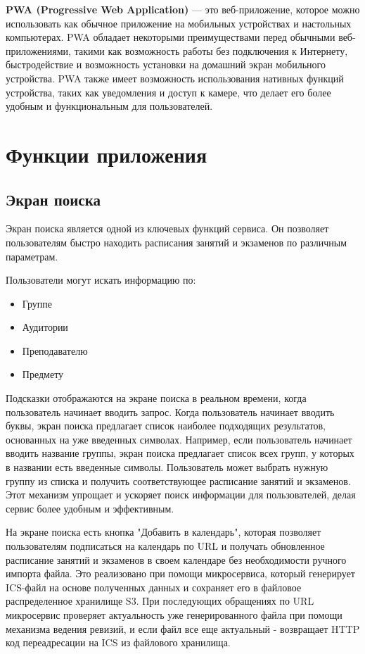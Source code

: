 \textbf{PWA (Progressive Web Application)} --- это веб-приложение, 
которое можно использовать как обычное приложение на мобильных устройствах 
и настольных компьютерах. PWA обладает некоторыми преимуществами 
перед обычными веб-приложениями, такими как возможность работы без 
подключения к Интернету, быстродействие и возможность установки 
на домашний экран мобильного устройства. PWA также имеет 
возможность использования нативных функций устройства, 
таких как уведомления и доступ к камере, что делает его 
более удобным и функциональным для пользователей.

\section{Функции приложения}
\subsection{Экран поиска}
Экран поиска является одной из ключевых функций сервиса.
Он позволяет пользователям быстро находить расписания занятий и экзаменов по различным параметрам.

Пользователи могут искать информацию по:
\begin{itemize}
    \item Группе
    \item Аудитории
    \item Преподавателю
    \item Предмету
\end{itemize}

Подсказки отображаются на экране поиска в реальном времени, когда пользователь начинает вводить запрос.
Когда пользователь начинает вводить буквы, экран поиска предлагает список наиболее подходящих результатов,
основанных на уже введенных символах.
Например, если пользователь начинает вводить название группы,
экран поиска предлагает список всех групп, у которых в названии есть введенные символы.
Пользователь может выбрать нужную группу из списка и получить соответствующее расписание занятий и экзаменов.
Этот механизм упрощает и ускоряет поиск информации для пользователей,
делая сервис более удобным и эффективным.

На экране поиска есть кнопка "Добавить в календарь",
которая позволяет пользователям подписаться на календарь по URL
и получать обновленное расписание занятий и экзаменов
в своем календаре без необходимости ручного импорта файла.
Это реализовано при помощи микросервиса, который генерирует ICS-файл
на основе полученных данных и сохраняет его в файловое распределенное хранилище S3.
При последующих обращениях по URL микросервис проверяет актуальность
уже генерированного файла при помощи механизма ведения ревизий,
и если файл все еще актуальный - возвращает HTTP код переадресации на ICS из файлового хранилища.

